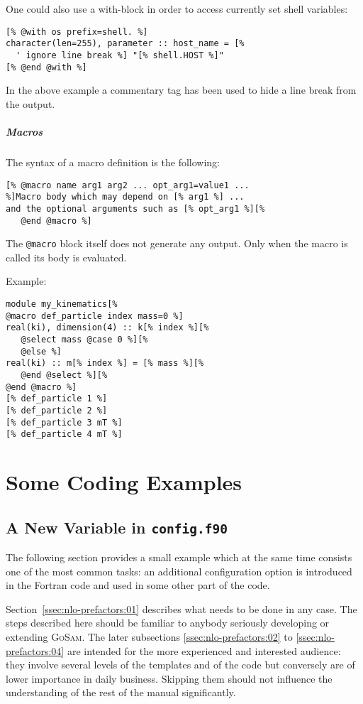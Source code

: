 \documentclass[11pt,a4paper]{refrep}
\newcommand{\golem}{\textsc{GoSam}\xspace}
\begin{document}
One could also use a with-block in order to access currently set
shell variables:
\begin{lstlisting}
[% @with os prefix=shell. %]
character(len=255), parameter :: host_name = [%
  ' ignore line break %] "[% shell.HOST %]"
[% @end @with %]
\end{lstlisting}
In the above example a commentary tag has been used to hide a
line break from the output.

\paragraph{Macros}
The syntax of a macro definition is the following:
\begin{lstlisting}[language=gosamt]
[% @macro name arg1 arg2 ... opt_arg1=value1 ...
%]Macro body which may depend on [% arg1 %] ...
and the optional arguments such as [% opt_arg1 %][%
   @end @macro %]
\end{lstlisting}

\attention{} The \texttt{@macro} block itself does not generate
any output. Only when the macro is called its body is evaluated.

Example:
\begin{lstlisting}
module my_kinematics[%
@macro def_particle index mass=0 %]
real(ki), dimension(4) :: k[% index %][%
   @select mass @case 0 %][%
   @else %]
real(ki) :: m[% index %] = [% mass %][%
   @end @select %][%
@end @macro %]
[% def_particle 1 %]
[% def_particle 2 %]
[% def_particle 3 mT %]
[% def_particle 4 mT %]
\end{lstlisting}

\chapter{Some Coding Examples}

\section{A New Variable in \texttt{config.f90}}
The following section provides a small example which at the same time
consists one of the most common tasks: an additional configuration option
is introduced in the Fortran code and used in some other part of the code.

Section~\ref{ssec:nlo-prefactors:01} describes what needs to be done in
any case. The steps described here should be familiar to anybody seriously
developing or extending \golem{}. The later subsections 
\ref{ssec:nlo-prefactors:02} to \ref{ssec:nlo-prefactors:04} are intended
for the more experienced and interested audience: they involve several
levels of the templates and of the code but conversely are of lower
importance in daily business. Skipping them should not influence the
understanding of the rest of the manual significantly.
\end{document}
